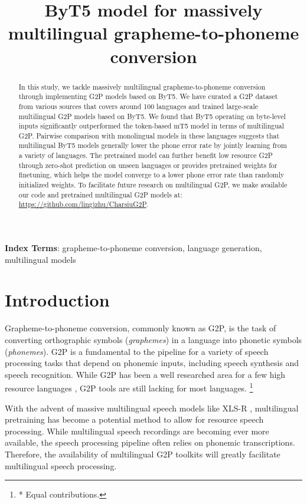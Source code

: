 \documentclass[a4paper]{article}
\title{ByT5 model for massively multilingual grapheme-to-phoneme conversion}
\newcommand\blfootnote[1]{%
  \begingroup
  \renewcommand\thefootnote{}\footnote{#1}%
  \addtocounter{footnote}{-1}%
  \endgroup
}
\begin{document}
\maketitle

\begin{abstract}
In this study, we tackle massively multilingual grapheme-to-phoneme conversion through implementing G2P models based on ByT5. We have curated a G2P dataset from various sources that covers around 100 languages and trained large-scale multilingual G2P models based on ByT5. We found that ByT5 operating on byte-level inputs significantly outperformed the token-based mT5 model in terms of multilingual G2P. Pairwise comparison with monolingual models in these languages suggests that multilingual ByT5 models generally lower the phone error rate by jointly learning from a variety of languages. The pretrained model can further benefit low resource G2P through zero-shot prediction on unseen languages or provides pretrained weights for finetuning, which helps the model converge to a lower phone error rate than randomly initialized weights. To facilitate future research on multilingual G2P, we make available our code and pretrained multilingual G2P models at: \url{https://github.com/lingjzhu/CharsiuG2P}.
\end{abstract}
\noindent\textbf{Index Terms}: grapheme-to-phoneme conversion, language generation, multilingual models

\section{Introduction}
Grapheme-to-phoneme conversion, commonly known as G2P, is the task of converting orthographic symbols (\textit{graphemes}) in a language into phonetic symbols (\textit{phonemes}). 
G2P is a fundamental to the pipeline for a variety of speech processing tasks that depend on phonemic inputs, including speech synthesis and speech recognition. While G2P has been a well researched area for a few high resource languages \cite{bisani2008joint,novak-etal-2012-wfst,rao2015grapheme,yao15_interspeech,toshniwal2016jointly,mousa2016deep,milde2017multitask,yolchuyeva19_interspeech,Sun2019,Park2020}, G2P tools are still lacking for most languages.
\blfootnote{* Equal contributions.}
With the advent of massive multilingual speech models like XLS-R \cite{babu2021xls,conneau2020unsupervised}, multilingual pretraining has become a potential method to allow for resource speech processing. While multilingual speech recordings are becoming ever more available, the speech processing pipeline often relies on phonemic transcriptions. Therefore, the availability of multilingual G2P toolkits will greatly facilitate multilingual speech processing.
\end{document}

